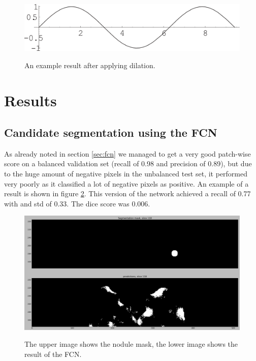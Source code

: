 \documentclass{article}
\begin{document}
\begin{itemize}
	\begin{figure}[h]
	\centering
	{\includegraphics[width=0.7\linewidth]{./figure.png}}
	\caption{An example result after applying dilation. \label{figure:dilationresult}}
	\end{figure}
\end{itemize}


\section{Results}\label{sec:results}
\subsection{Candidate segmentation using the FCN}
As already noted in section \ref{sec:fcn} we managed to get a very good patch-wise score on a balanced validation set (recall of 0.98 and precision of 0.89), but due to the huge amount of negative pixels in the unbalanced test set, it performed very poorly as it classified a lot of negative pixels as positive. An example of a result is shown in figure \ref{figure:nodules}. This version of the network achieved a recall of 0.77 with and std of 0.33. The dice score was 0.006. 

\begin{figure}[h]
	\centering
	{\includegraphics[width=0.7\linewidth]{./niet_zo_goed.png}}
	\caption{The upper image shows the nodule mask, the lower image shows the result of the FCN. \label{figure:nodules}}
\end{figure}
\end{document}
